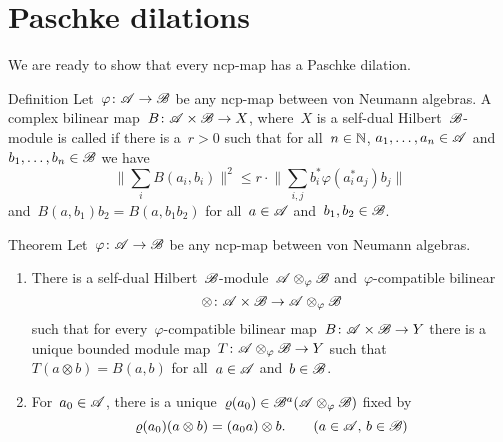 \section{Paschke dilations}
\begin{parsec}%
\begin{point}%
    We are ready to show that every ncp-map has a Paschke dilation.
\end{point}
\begin{point}{Definition}%
    Let~$\varphi\colon \mathscr{A} \to \mathscr{B}$ be any ncp-map between
        von Neumann algebras.
    A complex bilinear map~$B \colon \mathscr{A} \times \mathscr{B} \to X$,
        where~$X$ is a self-dual Hilbert~$\mathscr{B}$-module is
        called 
        if there is a~$r > 0$
        such that for all~$n\in \mathbb{N}$, $a_1, \ldots, a_n \in \mathscr{A}$
        and~$b_1, \ldots, b_n \in \mathscr{B}$ we have
        \begin{equation}
            \bigl\| \sum_i B(a_i,b_i)\bigr\|^2
                \leq r \cdot \bigl\| \sum_{i,j} b_i^* \varphi(a_i^*a_j)b_j
                \bigr\| \label{phi-compatible}
        \end{equation}
        and~$B(a,b_1)b_2 = B(a,b_1b_2)$
        for all~$a \in \mathscr{A}$ and~$b_1,b_2 \in \mathscr{B}$.
\end{point}
\begin{point}{Theorem}%
    Let~$\varphi\colon \mathscr{A} \to \mathscr{B}$ be any ncp-map between
        von Neumann algebras.
\begin{enumerate}
    \item There is a self-dual Hilbert~$\mathscr{B}$-module~$\mathscr{A} \otimes_\varphi
            \mathscr{B}$ and~$\varphi$-compatible bilinear
    \begin{equation*}
        \otimes \colon \mathscr{A} \times \mathscr{B} \to \mathscr{A} \otimes_\varphi \mathscr{B}
    \end{equation*}
    such that for every~$\varphi$-compatible bilinear
    map~$B \colon \mathscr{A} \times \mathscr{B} \to Y$
    there is a unique bounded
    module map~$T\colon \mathscr{A} \otimes_\varphi \mathscr{B} \to Y$
    such that~$T(a \otimes b) = B(a,b)$ for all~$a \in \mathscr{A}$ and~$b \in \mathscr{B}$.
\item
    For~$a_0 \in \mathscr{A}$,
    there is a unique~$\varrho(a_0) \in \mathscr{B}^a(\mathscr{A} \otimes_\varphi \mathscr{B})$
            fixed by
            \begin{equation*}
                \varrho(a_0)(a\otimes b) = (a_0 a)\otimes b.
                    \text{\qquad ($a\in \scrA$, $b \in \scrB$)}

\end{equation*}
\end{enumerate}
\end{point}
\end{parsec}
